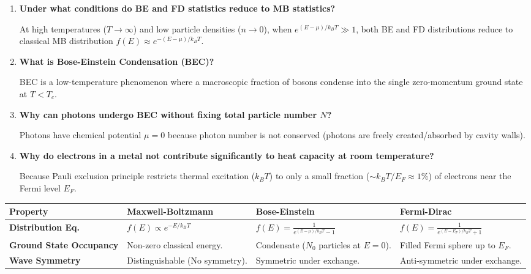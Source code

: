 \documentclass[12pt,a4paper]{article}
\newcommand{\Q}[1]{\textbf{#1}\par\noindent\ignorespaces}
\begin{document}
\begin{tcolorbox}[exambox, title={\textbf{Frequently Asked / Viva Questions}}]
\begin{enumerate}[topsep=0pt, label=\textbf{Q\arabic*.}, itemsep=5pt]
  \item \Q{Under what conditions do BE and FD statistics reduce to MB statistics?}
  At high temperatures ($T \to \infty$) and low particle densities ($n \to 0$), when $e^{(E-\mu)/k_B T} \gg 1$, both BE and FD distributions reduce to classical MB distribution $f(E) \approx e^{-(E-\mu)/k_B T}$.

  \item \Q{What is Bose-Einstein Condensation (BEC)?}
  BEC is a low-temperature phenomenon where a macroscopic fraction of bosons condense into the single zero-momentum ground state at $T < T_c$.

  \item \Q{Why can photons undergo BEC without fixing total particle number $N$?}
  Photons have chemical potential $\mu = 0$ because photon number is not conserved (photons are freely created/absorbed by cavity walls).

  \item \Q{Why do electrons in a metal not contribute significantly to heat capacity at room temperature?}
  Because Pauli exclusion principle restricts thermal excitation ($k_B T$) to only a small fraction ($\sim k_B T / E_F \approx 1\%$) of electrons near the Fermi level $E_F$.
\end{enumerate}
\end{tcolorbox}

\begin{tcolorbox}[tikzbox, title={Summary Comparison of Quantum Statistics}]
\centering
\begin{tabularx}{\linewidth}{|B{3.2cm}|Y|Y|Y|}
\hline
\textbf{Property} & \textbf{Maxwell-Boltzmann} & \textbf{Bose-Einstein} & \textbf{Fermi-Dirac} \\
\hline
\textbf{Distribution Eq.} & $f(E) \propto e^{-E/k_B T}$ & $f(E) = \frac{1}{e^{(E-\mu)/k_B T} - 1}$ & $f(E) = \frac{1}{e^{(E-E_F)/k_B T} + 1}$ \\
\hline
\textbf{Ground State Occupancy} & Non-zero classical energy. & Condensate ($N_0$ particles at $E=0$). & Filled Fermi sphere up to $E_F$. \\
\hline
\textbf{Wave Symmetry} & Distinguishable (No symmetry). & Symmetric under exchange. & Anti-symmetric under exchange. \\
\hline
\end{tabularx}
\end{tcolorbox}
\end{document}
